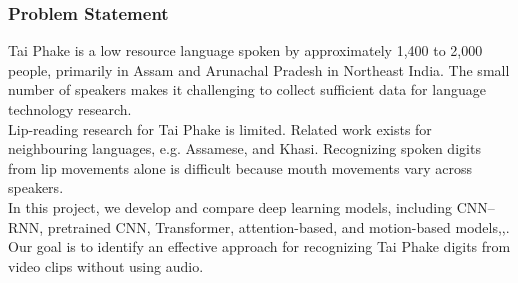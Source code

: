 \documentclass[aspectratio=169, 10pt]{beamer}
\begin{document}
\begin{frame}
\frametitle{Problem Statement}

\vspace{0.1cm}
{\fontsize{10.5}{15.5}\selectfont
Tai Phake is a low resource language spoken by approximately 1,400 to 2,000 people\cite{deka2025}, primarily in Assam and Arunachal Pradesh in Northeast India. The small number of speakers makes it challenging to collect sufficient data for language technology research.\\[0.45cm]

Lip-reading research for Tai Phake is limited. Related work exists for neighbouring languages, e.g. Assamese\cite{prasad2025}, and Khasi\cite{lyngdoh2026}. Recognizing spoken digits from lip movements alone is difficult because mouth movements vary across speakers\cite{lyngdoh2026}.\\[0.45cm]

In this project, we develop and compare deep learning models, including CNN--RNN, pretrained CNN, Transformer, attention-based, and motion-based models\cite{prasad2025},\cite{prajwal2022},\cite{chung2017}. Our goal is to identify an effective approach for recognizing Tai Phake digits from video clips without using audio.}
\end{frame}
\end{document}
